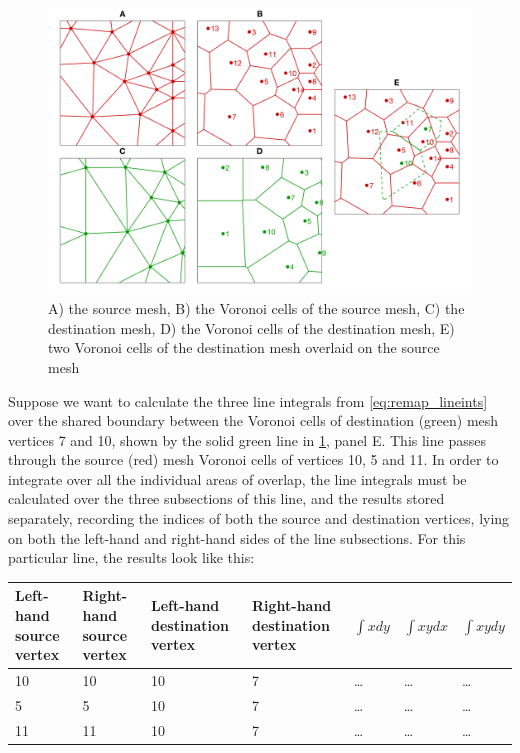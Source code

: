 \documentclass{article}
\begin{document}
\begin{figure}[H] \label{fig:remapping}
  \includegraphics[width=0.9\linewidth]{Fig_remapping.png}
  \caption{A) the source mesh, B) the Voronoi cells of the source mesh, C) the destination mesh, D) the Voronoi cells of the destination mesh, E) two Voronoi cells of the destination mesh overlaid on the source mesh}
\end{figure}

Suppose we want to calculate the three line integrals from \eqref{eq:remap_lineints} over the shared boundary between the Voronoi cells of destination (green) mesh vertices 7 and 10, shown by the solid green line in \ref{fig:remapping}, panel E. This line passes through the source (red) mesh Voronoi cells of vertices 10, 5 and 11. In order to integrate over all the individual areas of overlap, the line integrals must be calculated over the three subsections of this line, and the results stored separately, recording the indices of both the source and destination vertices, lying on both the left-hand and right-hand sides of the line subsections. For this particular line, the results look like this:

\begin{center}
\begin{tabular}{ | m{5em} | m{5em} | m{5em} | m{5em} | m{5em} | m{5em} | m{5em} | } 
\hline
Left-hand source vertex & Right-hand source vertex & Left-hand destination vertex & Right-hand destination vertex & $\int xdy$ & $\int xydx$ & $\int xydy$ \\
\hline
10 & 10 & 10 & 7 & \ldots & \ldots & \ldots \\
5 & 5 & 10 & 7 & \ldots & \ldots & \ldots \\
11 & 11 & 10 & 7 & \ldots & \ldots & \ldots \\
\hline
\end{tabular}
\end{center}
\end{document}
